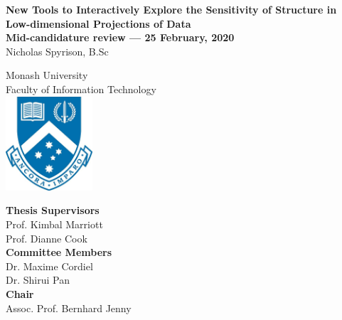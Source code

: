 \documentclass[
  11,
]{article}
\author{}
\date{\vspace{-2.5em}}
\begin{document}

\onehalfspacing
{}

\begin{center}
\huge{\textbf{New Tools to Interactively Explore the Sensitivity of Structure in Low-dimensional Projections of Data}}\\
\vspace*{1\baselineskip}
\Large{\textbf{Mid-candidature review --- 25 February, 2020}}\\
\LARGE{Nicholas Spyrison, B.Sc}\\
\vspace*{1\baselineskip}

\LARGE{Monash University}\\
\Large{Faculty of Information Technology}\\
\vspace*{1\baselineskip}
\includegraphics[height = 3.5cm]{./figures/crest.jpg}\\
\vspace*{1\baselineskip}

\Large{\textbf{Thesis Supervisors}}\\
Prof. Kimbal Marriott\\
Prof. Dianne Cook\\
\vspace*{1\baselineskip}
\Large{\textbf{Committee Members}}\\
Dr. Maxime Cordiel\\
Dr. Shirui Pan\\
\vspace*{1\baselineskip}
\Large{\textbf{Chair}}\\
Assoc. Prof. Bernhard Jenny\\
\end{center}

\doublespacing

\newpage
{}
\end{document}
